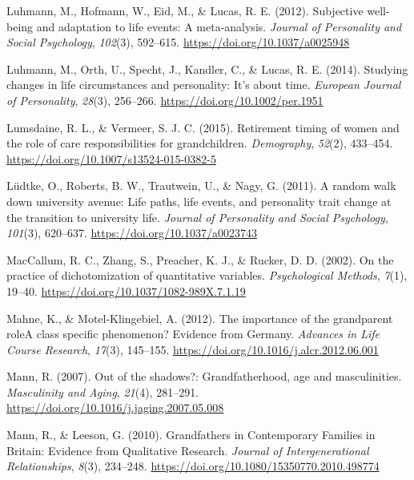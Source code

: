 \documentclass[
  english,
  man,floatsintext]{apa7}
\begin{document}
\leavevmode\hypertarget{ref-luhmannSubjectiveWellbeingAdaptation2012}{}%
Luhmann, M., Hofmann, W., Eid, M., \& Lucas, R. E. (2012). Subjective well-being and adaptation to life events: A meta-analysis. \emph{Journal of Personality and Social Psychology}, \emph{102}(3), 592--615. \url{https://doi.org/10.1037/a0025948}

\leavevmode\hypertarget{ref-luhmannStudyingChangesLife2014}{}%
Luhmann, M., Orth, U., Specht, J., Kandler, C., \& Lucas, R. E. (2014). Studying changes in life circumstances and personality: It's about time. \emph{European Journal of Personality}, \emph{28}(3), 256--266. \url{https://doi.org/10.1002/per.1951}

\leavevmode\hypertarget{ref-lumsdaineRetirementTimingWomen2015}{}%
Lumsdaine, R. L., \& Vermeer, S. J. C. (2015). Retirement timing of women and the role of care responsibilities for grandchildren. \emph{Demography}, \emph{52}(2), 433--454. \url{https://doi.org/10.1007/s13524-015-0382-5}

\leavevmode\hypertarget{ref-ludtkeRandomWalkUniversity2011}{}%
Lüdtke, O., Roberts, B. W., Trautwein, U., \& Nagy, G. (2011). A random walk down university avenue: Life paths, life events, and personality trait change at the transition to university life. \emph{Journal of Personality and Social Psychology}, \emph{101}(3), 620--637. \url{https://doi.org/10.1037/a0023743}

\leavevmode\hypertarget{ref-maccallumPracticeDichotomizationQuantitative2002}{}%
MacCallum, R. C., Zhang, S., Preacher, K. J., \& Rucker, D. D. (2002). On the practice of dichotomization of quantitative variables. \emph{Psychological Methods}, \emph{7}(1), 19--40. \url{https://doi.org/10.1037/1082-989X.7.1.19}

\leavevmode\hypertarget{ref-mahneImportanceGrandparentRole2012}{}%
Mahne, K., \& Motel-Klingebiel, A. (2012). The importance of the grandparent roleA class specific phenomenon? Evidence from Germany. \emph{Advances in Life Course Research}, \emph{17}(3), 145--155. \url{https://doi.org/10.1016/j.alcr.2012.06.001}

\leavevmode\hypertarget{ref-mannOutShadowsGrandfatherhood2007}{}%
Mann, R. (2007). Out of the shadows?: Grandfatherhood, age and masculinities. \emph{Masculinity and Aging}, \emph{21}(4), 281--291. \url{https://doi.org/10.1016/j.jaging.2007.05.008}

\leavevmode\hypertarget{ref-mannGrandfathersContemporaryFamilies2010}{}%
Mann, R., \& Leeson, G. (2010). Grandfathers in Contemporary Families in Britain: Evidence from Qualitative Research. \emph{Journal of Intergenerational Relationships}, \emph{8}(3), 234--248. \url{https://doi.org/10.1080/15350770.2010.498774}
\end{document}
